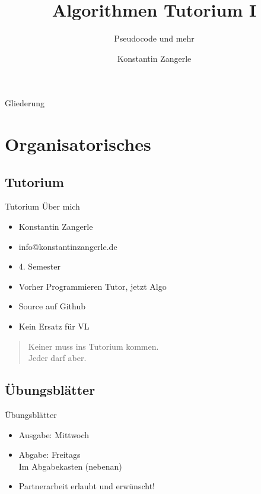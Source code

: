 \documentclass[18pt]{beamer}
\title[Algo I Tut]{Algorithmen Tutorium I}
\subtitle{Pseudocode und mehr}
\author[Zangerle]{Konstantin Zangerle}
\institute{Institut für Theoretische Informatik}
\begin{document}

\begin{frame}
\titlepage
\end{frame}

\begin{frame}{Gliederung}
 \tableofcontents
\end{frame}

\section{Organisatorisches}
\subsection{Tutorium}

\begin{frame}{Tutorium}
Über mich
\begin{itemize}
 \item Konstantin Zangerle
 \item info@konstantinzangerle.de
 \item 4. Semester
 \item Vorher Programmieren Tutor, jetzt Algo
 \item Source auf Github
 \item Kein Ersatz für VL
\end{itemize}

  \begin{quotation}
 Keiner muss ins Tutorium kommen. \\
 Jeder darf aber.  
  \end{quotation}

 
\end{frame}

\subsection{Übungsblätter}
\begin{frame}{Übungsblätter}
 \begin{itemize}
  \item Ausgabe: Mittwoch
  \item Abgabe: Freitags \\
    Im Abgabekasten (nebenan)
  \item Partnerarbeit erlaubt und erwünscht!
  
 \end{itemize}

\end{frame}
\end{document}
